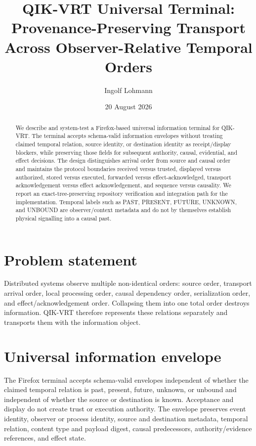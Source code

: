 \documentclass[11pt]{article}
\title{QIK-VRT Universal Terminal: Provenance-Preserving Transport Across Observer-Relative Temporal Orders}
\author{Ingolf Lohmann}
\date{20 August 2026}
\begin{document}
\maketitle
\begin{abstract}
We describe and system-test a Firefox-based universal information terminal for QIK-VRT. The terminal accepts schema-valid information envelopes without treating claimed temporal relation, source identity, or destination identity as receipt/display blockers, while preserving those fields for subsequent authority, causal, evidential, and effect decisions. The design distinguishes arrival order from source and causal order and maintains the protocol boundaries received versus trusted, displayed versus authorized, stored versus executed, forwarded versus effect-acknowledged, transport acknowledgement versus effect acknowledgement, and sequence versus causality. We report an exact-tree-preserving repository verification and integration path for the implementation. Temporal labels such as PAST, PRESENT, FUTURE, UNKNOWN, and UNBOUND are observer/context metadata and do not by themselves establish physical signalling into a causal past.
\end{abstract}

\section{Problem statement}
Distributed systems observe multiple non-identical orders: source order, transport arrival order, local processing order, causal dependency order, serialization order, and effect/acknowledgement order. Collapsing them into one total order destroys information. QIK-VRT therefore represents these relations separately and transports them with the information object.

\section{Universal information envelope}
The Firefox terminal accepts schema-valid envelopes independent of whether the claimed temporal relation is past, present, future, unknown, or unbound and independent of whether the source or destination is known. Acceptance and display do not create trust or execution authority. The envelope preserves event identity, observer or process identity, source and destination metadata, temporal relation, content type and payload digest, causal predecessors, authority/evidence references, and effect state.
\end{document}
